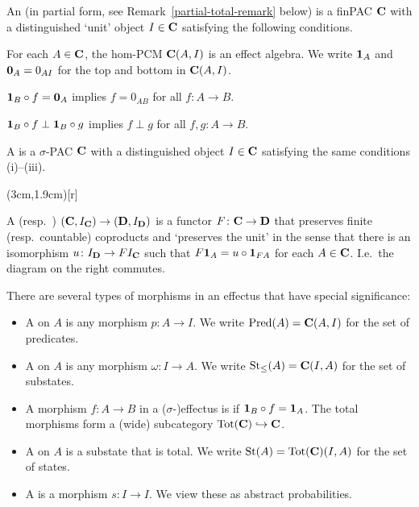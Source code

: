 \documentclass[%
	submission,
copyright,creativecommons,UKenglish]{eptcs}
\begin{document}
\begin{definition}
\label{def:effectus}
    An 
(in partial form, see Remark~\ref{partial-total-remark} below) is a finPAC $\mathbf{C}$
with a distinguished `unit' object $I\in\mathbf{C}$
satisfying
the following conditions.
\begin{myenum}
\item
For each $A\in\mathbf{C}$,
the hom-PCM $\mathbf{C}(A,I)$ is an effect algebra.
We write $\mathbf{1}_A$
and $\mathbf{0}_A=0_{A I}$
for the top and bottom in $\mathbf{C}(A,I)$.
\item
$\mathbf{1}_B\circ f=\mathbf{0}_A$ implies $f=0_{A B}$
for all $f\colon A\to B$.
\item
$\mathbf{1}_B\circ f\perp \mathbf{1}_B\circ g$
implies $f\perp g$
for all $f,g\colon A\to B$.
\end{myenum}
A  is a $\sigma$-PAC
$\mathbf{C}$ with a distinguished
object $I\in\mathbf{C}$ satisfying the same conditions (i)--(iii).

\parpic(3cm,1.9cm)[r]{%
}
A  (resp.\ )
$(\mathbf{C},I_{\mathbf{C}})\rightarrow (\mathbf{D},I_{\mathbf{D}})$ is a
functor $F\colon \mathbf{C}\to\mathbf{D}$
that preserves finite (resp.\ countable) coproducts
and `preserves the unit' in the sense that
there is an isomorphism $u\colon I_{\mathbf{D}}\to FI_{\mathbf{C}}$
such that $F\mathbf{1}_A=u\circ \mathbf{1}_{FA}$ for each $A\in\mathbf{C}$. 
I.e.~the diagram on the right commutes.
\end{definition}

There are several types of morphisms in an effectus that have special significance:
\begin{itemize}
	\item A  on $A$ is any morphism $p\colon A\to I$. 
	We write $\mathrm{Pred}(A)=\mathbf{C}(A,I)$ for the set of predicates.
	\item A  on $A$ is any morphism $\omega\colon I\to A$.
	We write $\mathrm{St}_{\le}(A) = \mathbf{C}(I,A)$ for the set of substates.
	\item A morphism $f\colon A\to B$ in a ($\sigma$-)effectus
is  if $\mathbf{1}_B \circ f=\mathbf{1}_A$. The total morphisms form a (wide) subcategory
$\mathrm{Tot}(\mathbf{C})\hookrightarrow\mathbf{C}$.
\item A  on $A$ is a substate that is total. We write $\mathrm{St}(A)=\mathrm{Tot}(\mathbf{C})(I,A)$ for the set of states.
\item A  is a morphism $s\colon I\to I$.
We view these as abstract probabilities.
\end{itemize}
\end{document}
